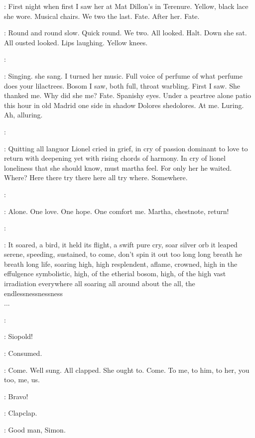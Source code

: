 \BloomInt:
First night when first I saw her at Mat Dillon's in Terenure.
Yellow,
black lace she wore.
Musical chairs.
We two the last.
Fate.
After her.
Fate.

\BloomInt:
Round and round slow.
Quick round.
We two.
All looked.
Halt.
Down she
sat.
All ousted looked.
Lips laughing.
Yellow knees.

\simon:

\BloomInt:
Singing.
 she sang.
I turned her music.
Full voice of perfume
of what perfume does your lilactrees.
Bosom I saw,
both full,
throat
warbling.
First I saw.
She thanked me.
Why did she me?
Fate.
Spanishy
eyes.
Under a peartree alone patio this hour in old Madrid one side in
shadow Dolores shedolores.
At me.
Luring.
Ah,
alluring.

\simon:

\BloomInt:
Quitting all languor Lionel cried in grief,
in cry of passion dominant
to love to return with deepening yet with rising chords of harmony.
In cry
of lionel loneliness that she should know,
must martha feel.
For only her
he waited.
Where?
Here there try there here all try where.
Somewhere.

\simon:

\BloomInt:
Alone.
One love.
One hope.
One comfort me.
Martha,
chestnote,
return!

\simon:

:
It soared,
a bird,
it held its flight,
a swift pure cry,
soar silver orb
it leaped serene,
speeding,
sustained,
to come,
don't spin it out too long
long breath he breath long life,
soaring high,
high resplendent,
aflame,
crowned,
high in the effulgence symbolistic,
high,
of the etherial bosom,
high,
of the high vast irradiation everywhere all soaring all around about
the all,
the endlessnessnessness%
\\
...

\simon:

\BloomInt:
Siopold!

\BloomInt:
Consumed.

\BloomInt:
Come.
Well sung.
All clapped.
She ought to.
Come.
To me,
to him,
to
her,
you too,
me,
us.

\lenehan:
Bravo!

:
Clapclap.

\dollard:
Good man,
Simon.

